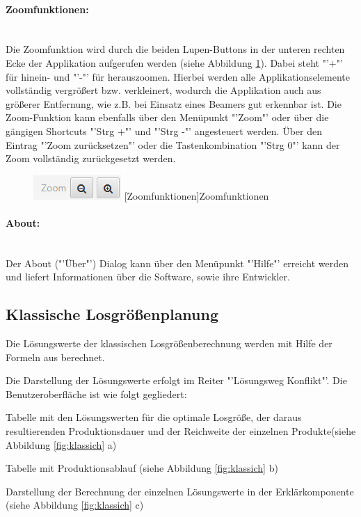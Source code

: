 \paragraph{Zoomfunktionen:}~\\
Die Zoomfunktion wird durch die beiden Lupen-Buttons in der unteren rechten Ecke der Applikation aufgerufen werden (siehe Abbildung \ref{fig:zoom}). Dabei steht "'+"' für hinein- und "'-"' für herauszoomen. Hierbei werden alle Applikationselemente vollständig vergrößert bzw. verkleinert, wodurch die Applikation auch aus größerer Entfernung, wie z.B. bei Einsatz eines Beamers gut erkennbar ist. Die Zoom-Funktion kann ebenfalls über den Menüpunkt "'Zoom"' oder über die gängigen Shortcuts "'Strg +"' und "'Strg -"' angesteuert werden. Über den Eintrag "'Zoom zurücksetzen"' oder die Tastenkombination "'Strg 0"' kann der Zoom vollständig zurückgesetzt werden.
\begin{figure}[H]
	\centering
	\includegraphics[width=0.3\linewidth]{Bilder/Zoom.png} 
	[Zoomfunktionen]{Zoomfunktionen}
	\label{fig:zoom}
\end{figure}

\paragraph{About:}~\\
Der About ("'Über"') Dialog kann über den Menüpunkt "'Hilfe"' erreicht werden und liefert Informationen über die Software, sowie ihre Entwickler.

\subsection{Klassische Losgrößenplanung}
\label{ch:klassischeberechnung}
Die Lösungswerte der klassischen Losgrößenberechnung werden mit Hilfe der Formeln aus \cite{Templ09} berechnet.

Die Darstellung der Lösungswerte erfolgt im Reiter "'Lösungsweg Konflikt"'. Die Benutzeroberfläche ist wie folgt gegliedert:

\begin{compactitem}
	\item Tabelle mit den Lösungswerten für die optimale Losgröße, der daraus resultierenden Produktionsdauer und der Reichweite der einzelnen Produkte(siehe Abbildung \ref{fig:klassich} a)
	\item Tabelle mit Produktionsablauf (siehe Abbildung \ref{fig:klassich} b)
	\item Darstellung der Berechnung der einzelnen Lösungswerte in der Erklärkomponente (siehe Abbildung \ref{fig:klassich} c)
\end{compactitem}

